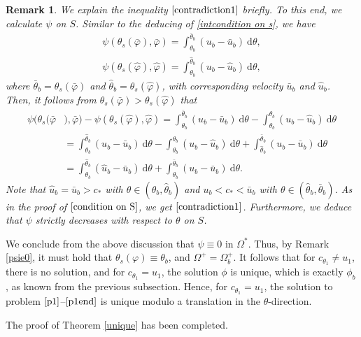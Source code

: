 \documentclass[10pt,a4paper]{amsart}
\newcommand{\dd}{\mathrm{d}}
\newtheorem{remark}{Remark}[section]
\numberwithin{equation}{section}
\begin{document}
\begin{remark} \label{rem24}%
	We explain the inequality $\eqref{contradiction1}$ briefly. To this end, we calculate $\psi$ on $S$. Similar to the deducing of  \eqref{intcondition on s}, we have 	
	\begin{align*}
		\psi(\theta_{s}(\bar{\varphi}),\bar{\varphi})=\int^{\bar{\theta}_b}_{\theta_b}(u_b-\bar{u}_b)~\dd\theta,\\
		\psi(\theta_s(\hat{\varphi}),\hat{\varphi})=\int^{\hat{\theta}_b}_{\theta_b}(u_b-\hat{u}_b)~\dd\theta,
	\end{align*}
	where $\bar{\theta}_b=\theta_s(\bar{\varphi})$ and $\hat{\theta}_b=\theta_s(\hat{\varphi})$, with corresponding velocity $\bar{u}_b$ and  $\hat{u}_b$. Then, it follows from $\theta_{s}(\bar{\varphi})>\theta_s(\hat{\varphi})$ that
	\begin{align*}
		\psi(\theta_{s}(\bar{\varphi}&),\bar{\varphi})-\psi(\theta_s(\hat{\varphi}),\hat{\varphi})=\int^{\bar{\theta}_b}_{\theta_b}(u_b-\bar{u}_b)~\dd\theta-\int^{\hat{\theta}_b}_{\theta_b}(u_b-\hat{u}_b)~\dd\theta\\
		&=\int^{\hat{\theta}_b}_{\theta_b}(u_b-\bar{u}_b)~\dd\theta-\int^{\hat{\theta}_b}_{\theta_b}(u_b-\hat{u}_b)~\dd\theta +\int^{\bar{\theta}_b}_{\hat{\theta}_b}(u_b-\bar{u}_b)~\dd\theta\\
		&=\int^{\hat{\theta}_b}_{\theta_b}(\hat{u}_b-\bar{u}_b)~\dd\theta+\int^{\bar{\theta}_b}_{\hat{\theta}_b}(u_b-\bar{u}_b)~\dd\theta.
	\end{align*}
	Note that $\hat{u}_b=\bar{u}_b>c_*$ with $\theta\in(\theta_b,\hat{\theta}_b)$ and $u_b<c_*<\bar{u}_b$ with $\theta\in(\hat{\theta}_b,\bar{\theta}_b)$. As in the proof of $\eqref{condition on S}$, we get $\eqref{contradiction1}$. Furthermore, we deduce that $\psi$  strictly decreases with respect to $\theta$ on $S$.
\end{remark}

We conclude from the above discussion that $\psi\equiv 0$ in $\Omega^*$. Thus, by Remark \ref{psie0}, it must hold that $\theta_s(\varphi)\equiv \theta_b$, and $\Omega^+=\Omega_b^+$. It follows that for $c_{\theta_1}\neq u_1$, there is no solution, and for $c_{\theta_1}= u_1$, the solution $\phi$ is unique, which is exactly $\phi_b$, as known from the previous subsection. Hence, for $c_{\theta_1}= u_1$, the solution to problem $\eqref{p1}$--$\eqref{p1end}$ is unique modulo a translation in the $\theta$-direction.

The proof of Theorem \ref{unique} has been completed.
\end{document}
